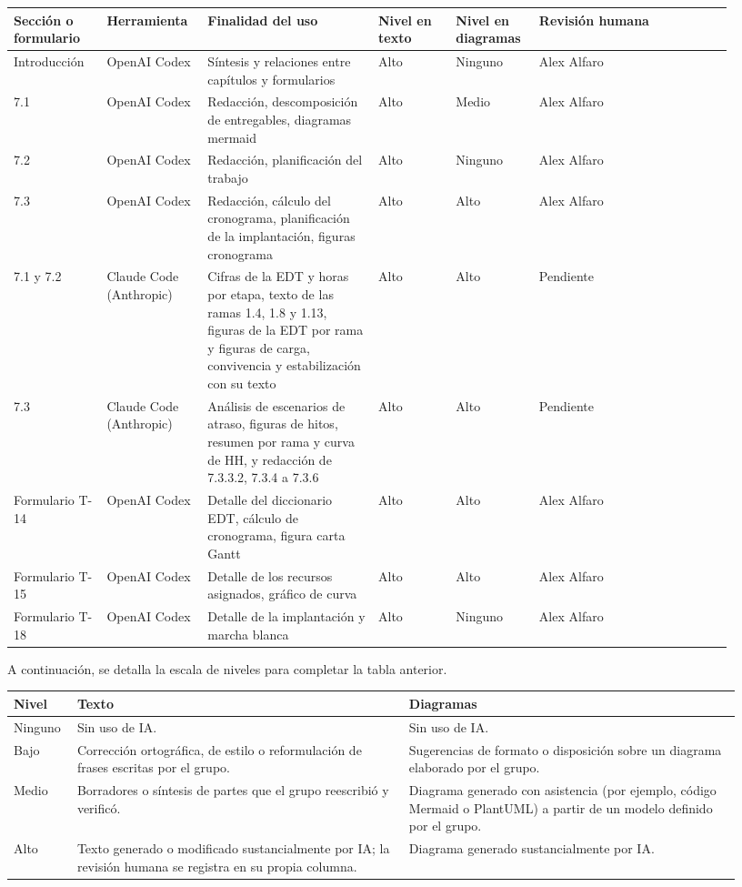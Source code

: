 \documentclass[11pt]{article}
\begin{document}
\begin{longtable}{p{0.12\linewidth}p{0.13\linewidth}p{0.22\linewidth}p{0.10\linewidth}p{0.10\linewidth}p{0.25\linewidth}}
\toprule
Sección o formulario & Herramienta & Finalidad del uso & Nivel en texto & Nivel en diagramas & Revisión humana \\
\midrule
\endhead
Introducción & OpenAI Codex & Síntesis y relaciones entre capítulos y formularios & Alto & Ninguno & Alex Alfaro \\
7.1 & OpenAI Codex & Redacción, descomposición de entregables, diagramas mermaid & Alto & Medio & Alex Alfaro \\
7.2 & OpenAI Codex & Redacción, planificación del trabajo & Alto & Ninguno & Alex Alfaro \\
7.3 & OpenAI Codex & Redacción, cálculo del cronograma, planificación de la implantación, figuras cronograma & Alto & Alto & Alex Alfaro \\
7.1 y 7.2 & Claude Code (Anthropic) & Cifras de la EDT y horas por etapa, texto de las ramas 1.4, 1.8 y 1.13, figuras de la EDT por rama y figuras de carga, convivencia y estabilización con su texto & Alto & Alto & Pendiente \\
7.3 & Claude Code (Anthropic) & Análisis de escenarios de atraso, figuras de hitos, resumen por rama y curva de HH, y redacción de 7.3.3.2, 7.3.4 a 7.3.6 & Alto & Alto & Pendiente \\
Formulario T-14 & OpenAI Codex & Detalle del diccionario EDT, cálculo de cronograma, figura carta Gantt & Alto & Alto & Alex Alfaro \\
Formulario T-15 & OpenAI Codex & Detalle de los recursos asignados, gráfico de curva & Alto & Alto & Alex Alfaro \\
Formulario T-18 & OpenAI Codex & Detalle de la implantación y marcha blanca & Alto & Ninguno & Alex Alfaro \\
\bottomrule
\end{longtable}

A continuación, se detalla la escala de niveles para completar la tabla anterior.

\begin{tabular}{@{}p{0.069\linewidth}p{0.429\linewidth}p{0.429\linewidth}@{}}
\toprule Nivel & Texto & Diagramas \\
\midrule
Ninguno & Sin uso de IA. & Sin uso de IA. \\
Bajo & Corrección ortográfica, de estilo o reformulación de frases escritas por el grupo. & Sugerencias de formato o disposición sobre un diagrama elaborado por el grupo. \\
Medio & Borradores o síntesis de partes que el grupo reescribió y verificó. & Diagrama generado con asistencia (por ejemplo, código Mermaid o PlantUML) a partir de un modelo definido por el grupo. \\
Alto & Texto generado o modificado sustancialmente por IA; la revisión humana se registra en su propia columna. & Diagrama generado sustancialmente por IA. \\
\bottomrule
\end{tabular}

\ossFinalPage
\end{document}
